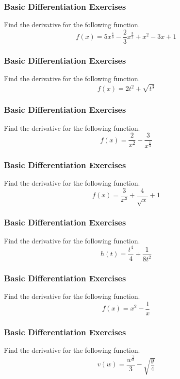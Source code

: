 \documentclass[xcolor=dvipsnames]{beamer}
\begin{document}
\begin{frame}
  \frametitle{Basic Differentiation Exercises}
{\ubung} Find the derivative for the following function.
\begin{equation}
  \label{eq:ohzahcer}
  f(x)=5x^{\frac{4}{3}}-\frac{2}{3}x^{\frac{3}{2}}+x^{2}-3x+1
\end{equation}
\end{frame}

\begin{frame}
  \frametitle{Basic Differentiation Exercises}
{\ubung} Find the derivative for the following function.
\begin{equation}
  \label{eq:mothoofi}
f(x)=2t^{2}+\sqrt{t^{3}}
\end{equation}
\end{frame}

\begin{frame}
  \frametitle{Basic Differentiation Exercises}
  {\ubung} Find the derivative for the following function.
\begin{equation}
  \label{eq:aiquooyo}
  f(x)=\frac{2}{x^{2}}-\frac{3}{x^{\frac{1}{3}}}
\end{equation}
\end{frame}

\begin{frame}
  \frametitle{Basic Differentiation Exercises}
  {\ubung} Find the derivative for the following function.
\begin{equation}
  \label{eq:achaingo}
f(x)=\frac{3}{x^{3}}+\frac{4}{\sqrt{x}}+1
\end{equation}
\end{frame}

\begin{frame}
  \frametitle{Basic Differentiation Exercises}
  {\ubung} Find the derivative for the following function.
\begin{equation}
  \label{eq:coojeing}
h(t)=\frac{t^{4}}{4}+\frac{1}{8t^{2}}
\end{equation}
\end{frame}

\begin{frame}
  \frametitle{Basic Differentiation Exercises}
  {\ubung} Find the derivative for the following function.
\begin{equation}
  \label{eq:aurieroo}
  f(x)=x^{2}-\frac{1}{x}
\end{equation}
\end{frame}

\begin{frame}
  \frametitle{Basic Differentiation Exercises}
  {\ubung} Find the derivative for the following function.
\begin{equation}
  \label{eq:zoogheem}
  v(w)=\frac{w^{\frac{1}{2}}}{3}-\sqrt{\frac{y}{4}}
\end{equation}
\end{frame}
\end{document}
